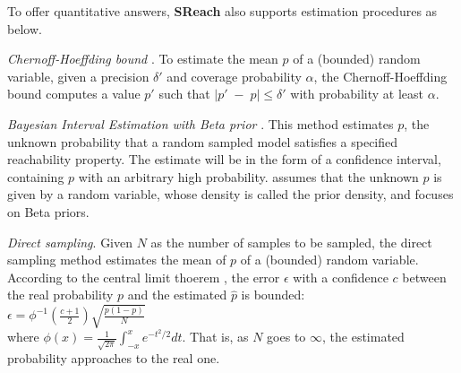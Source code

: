 To offer quantitative answers, {\bf SReach} also supports estimation procedures as below.

\textit{Chernoff-Hoeffding bound} \cite{hoeffding1963probability}. To estimate the mean $p$ of a (bounded) 
random variable, given a precision $\delta'$ and coverage probability $\alpha$, the Chernoff-Hoeffding bound 
computes a value $p'$ such that $|p' \; - \; p| \le \delta'$ with probability at least $\alpha$.

\textit{Bayesian Interval Estimation with Beta prior} \cite{zuliani2010bayesian}. This method estimates $p$, the unknown probability that a random sampled model satisfies a specified reachability property. 
The estimate will be in the form of a confidence interval, containing $p$ with an arbitrary high probability.  \cite{zuliani2010bayesian} assumes that the unknown $p$ is given by a random variable, whose density is called the prior density, and focuses on Beta priors. %

\textit{Direct sampling}. Given $N$ as the number of samples to be sampled, the direct sampling method estimates the mean of $p$ of a (bounded) random variable. According to the central limit thoerem \cite{durrett2010probability}, the error $\epsilon$ with a confidence $c$ between the real probability $p$ and the estimated $\hat{p}$ is bounded: \\
$\epsilon  =  \phi^{-1}\left ( \frac{c + 1}{2} \right ) \sqrt{\frac{p(1-p)}{N}}$\\
where $\phi(x) = \frac{1}{\sqrt{2\pi}} \int_{-x}^{x} e^{-t^2 / 2}dt$. That is, as $N$ goes to $\infty$, the estimated probability approaches to the real one.
